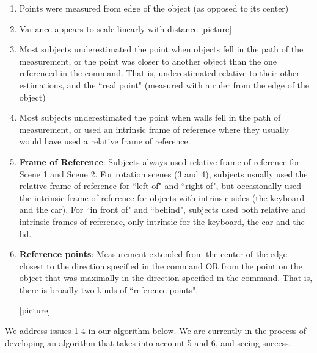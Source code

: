 \documentclass[12pt,letterpaper]{article}
\begin{document}
\begin{enumerate}[(1)]
\item Points were measured from edge of the object (as opposed to its center)
\item Variance appears to scale linearly with distance [picture]
\item Most subjects underestimated the point when objects fell in the path of the measurement, or the point was closer to another object than the one referenced in the command. That is, underestimated relative to their other estimations, and the ``real point" (measured with a ruler from the edge of the object)

\item Most subjects underestimated the point when walls fell in the path of measurement, or used an intrinsic frame of reference where they usually would have used a relative frame of reference.


\item \textbf{Frame of Reference}: Subjects always used relative frame of reference for Scene 1 and Scene 2. For rotation scenes (3 and 4), subjects usually used the relative frame of reference for ``left of" and ``right of", but occasionally used the intrinsic frame of reference for objects with intrinsic sides (the keyboard and the car). For ``in front of" and ``behind", subjects used both relative and intrinsic frames of reference, only intrinsic for the keyboard, the car and the lid. 

\item \textbf{Reference points}: Measurement extended from the center of the edge closest to the direction specified in the command OR from the point on the object that was maximally in the direction specified in the command. That is, there is broadly two kinds of ``reference points".

[picture]
\end{enumerate}

We address issues 1-4 in our algorithm below. We are currently in the process of developing an algorithm that takes into account 5 and 6, and seeing success.
\end{document}
